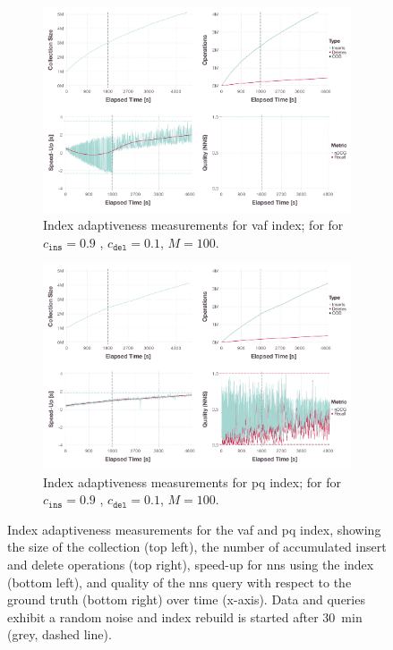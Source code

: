 \begin{figure}[p]
    \begin{subfigure}[b]{\textwidth}
        \centering
        \includegraphics[width=\textwidth]{figures/index/index-vaf-adaptiveness-90-10-with-rebuild-and-jitter}
        \caption{Index adaptiveness measurements for \acrshort{vaf} index; for for $c_{\texttt{ins}} = 0.9$ , $c_{\texttt{del}} = 0.1$, $M = 100$.}
        \label{figure:index_adaptiveness_vaf_90_10_jitter}
    \end{subfigure}
    \hfill
    \centering
    \begin{subfigure}[b]{\textwidth}
        \centering
        \includegraphics[width=\textwidth]{figures/index/index-pq-adaptiveness-90-10-with-rebuild-and-jitter}
        \caption{Index adaptiveness measurements for \acrshort{pq} index; for for $c_{\texttt{ins}} = 0.9$ , $c_{\texttt{del}} = 0.1$, $M = 100$.}
        \label{figure:index_adaptiveness_pq_90_10_jitter}
    \end{subfigure} 
    \caption{Index adaptiveness measurements for the \acrshort{vaf} and \acrshort{pq} index, showing the size of the collection (top left), the number of accumulated insert and delete operations (top right), speed-up for \acrshort{nns} using the index (bottom left), and quality of the \acrshort{nns} query with respect to the ground truth (bottom right) over time (x-axis). Data and queries exhibit a random noise and index rebuild is started after \SI{30}{\minute} (grey, dashed line).}
    \label{figure:index_adaptiveness_jitter}  
\end{figure}

